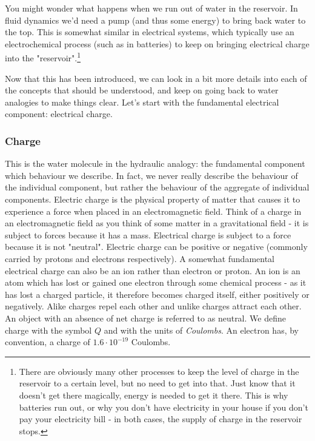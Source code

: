You might wonder what happens when we run out of water in the reservoir. In fluid dynamics we'd need a pump (and thus some energy) to bring back water to the top. This is somewhat similar in electrical systems, which typically use an electrochemical process (such as in batteries) to keep on bringing electrical charge into the "reservoir".\footnote{There are obviously many other processes to keep the level of charge in the reservoir to a certain level, but no need to get into that. Just know that it doesn't get there magically, energy is needed to get it there. This is why batteries run out, or why you don't have electricity in your house if you don't pay your electricity bill - in both cases, the supply of charge in the reservoir stops.}  

Now that this has been introduced, we can look in a bit more details into each of the concepts that should be understood, and keep on going back to water analogies to make things clear. Let's start with the fundamental electrical component: electrical charge. 

\subsubsection{Charge}

This is the water molecule in the hydraulic analogy: the fundamental component which behaviour we describe. In fact, we never really describe the behaviour of the individual component, but rather the behaviour of the aggregate of individual components. 
Electric charge is the physical property of matter that causes it to experience a force when placed in an electromagnetic field. Think of a charge in an electromagnetic field as you think of some matter in a gravitational field - it is subject to forces because it has a mass. Electrical charge is subject to a force because it is not "neutral". 
Electric charge can be positive or negative (commonly carried by protons and electrons respectively). A somewhat fundamental electrical charge can also be an ion rather than electron or proton. An ion is an atom which has lost or gained one electron through some chemical process - as it has lost a charged particle, it therefore becomes charged itself, either positively or negatively. Alike charges repel each other and unlike charges attract each other. An object with an absence of net charge is referred to as neutral. We define charge with the symbol $Q$ and with the units of \textit{Coulombs}. An electron has, by convention, a charge of $1.6 \cdot 10^{-19}$ Coulombs.  

